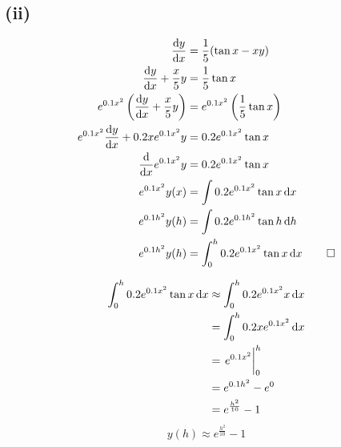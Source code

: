 \documentclass[a4paper]{article}
\begin{document}
\subsection*{(ii)}
\[\begin{aligned}
    \dv{y}{x}&=\frac15(\tan x-xy)\\
    \dv{y}{x}+\frac x5y&=\frac15\tan x\\
    e^{0.1x^2}\left(\dv{y}{x}+\frac x5y\right)&=e^{0.1x^2}\left(\frac15\tan x\right)\\
    e^{0.1x^2}\dv{y}{x}+0.2xe^{0.1x^2}y&=0.2e^{0.1x^2}\tan x\\
    \dv{}{x}e^{0.1x^2}y&=0.2e^{0.1x^2}\tan x\\
    e^{0.1x^2}y(x)&=\int0.2e^{0.1x^2}\tan x\dd{x}\\
    e^{0.1h^2}y(h)&=\int0.2e^{0.1h^2}\tan h\dd{h}\\
    e^{0.1h^2}y(h)&=\int_0^h0.2e^{0.1x^2}\tan x\dd{x}\qed
\end{aligned}\]

\[\begin{aligned}
    \int_0^h0.2e^{0.1x^2}\tan x\dd{x}&\approx\int_0^h0.2e^{0.1x^2}x\dd{x}\\
                                     &=\int_0^h0.2xe^{0.1x^2}\dd{x}\\
                                     &=\eval{e^{0.1x^2}}_0^h\\
                                     &=e^{0.1h^2}-e^0\\
                                     &=e^{\frac{h^2}{10}}-1
\end{aligned}\]
\[y(h)\approx\boxed{e^{\frac{h^2}{10}}-1}\]
\end{document}
